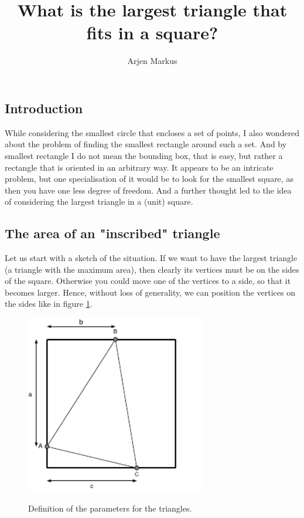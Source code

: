 \documentclass[onecolumn]{article}
\begin{document}
\title{What is the largest triangle that fits in a square?}

\author{Arjen Markus}

\maketitle

\subsection*{Introduction}
While considering the smallest circle that encloses a set of points, I also wondered about
the problem of finding the smallest rectangle around such a set. And by smallest rectangle
I do not mean the bounding box, that is easy, but rather a rectangle that is oriented in an
arbitrary way. It appears to be an intricate problem, but one specialisation of it would be
to look for the smallest square, as then you have one less degree of freedom. And a further
thought led to the idea of considering the largest triangle in a (unit) square.

\subsection*{The area of an "inscribed" triangle}

Let us start with a sketch of the situation. If we want to have the largest triangle (a
triangle with the maximum area), then clearly its vertices must be on the sides of the square.
Otherwise you could move one of the vertices to a side, so that it becomes larger. Hence,
without loss of generality, we can position the vertices on the sides like in figure \ref{definition_sketch}.

\begin{figure}[h]
\begin{center}
\caption{Definition of the parameters for the triangles.}
\includegraphics[width=0.7\textwidth]{triangle_sketch.pdf}
\label{definition_sketch}
\end{center}
\end{figure}
\end{document}
